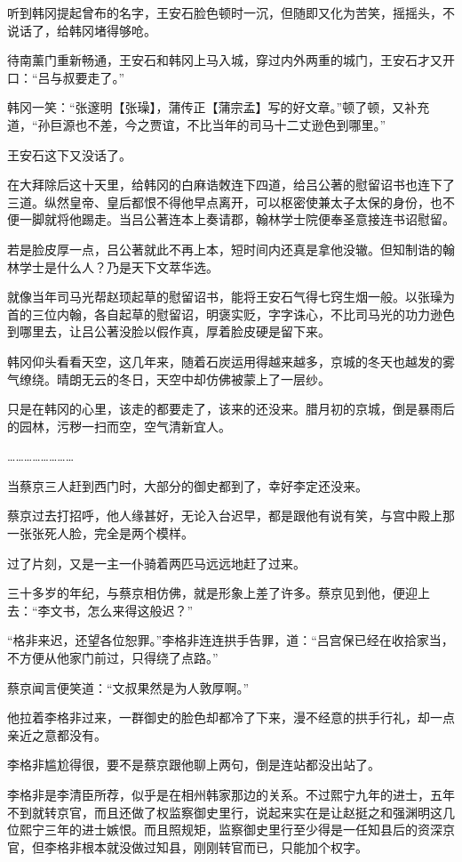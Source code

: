 听到韩冈提起曾布的名字，王安石脸色顿时一沉，但随即又化为苦笑，摇摇头，不说话了，给韩冈堵得够呛。 

待南薰门重新畅通，王安石和韩冈上马入城，穿过内外两重的城门，王安石才又开口：“吕与叔要走了。” 

韩冈一笑：“张邃明【张璪】，蒲传正【蒲宗孟】写的好文章。”顿了顿，又补充道，“孙巨源也不差，今之贾谊，不比当年的司马十二丈逊色到哪里。” 

王安石这下又没话了。 

在大拜除后这十天里，给韩冈的白麻诰敇连下四道，给吕公著的慰留诏书也连下了三道。纵然皇帝、皇后都恨不得他早点离开，可以枢密使兼太子太保的身份，也不便一脚就将他踢走。当吕公著连本上奏请郡，翰林学士院便奉圣意接连书诏慰留。 

若是脸皮厚一点，吕公著就此不再上本，短时间内还真是拿他没辙。但知制诰的翰林学士是什么人？乃是天下文萃华选。 

就像当年司马光帮赵顼起草的慰留诏书，能将王安石气得七窍生烟一般。以张璪为首的三位内翰，各自起草的慰留诏，明褒实贬，字字诛心，不比司马光的功力逊色到哪里去，让吕公著没脸以假作真，厚着脸皮硬是留下来。 

韩冈仰头看看天空，这几年来，随着石炭运用得越来越多，京城的冬天也越发的雾气缭绕。晴朗无云的冬日，天空中却仿佛被蒙上了一层纱。 

只是在韩冈的心里，该走的都要走了，该来的还没来。腊月初的京城，倒是暴雨后的园林，污秽一扫而空，空气清新宜人。 

…………………… 

当蔡京三人赶到西门时，大部分的御史都到了，幸好李定还没来。 

蔡京过去打招呼，他人缘甚好，无论入台迟早，都是跟他有说有笑，与宫中殿上那一张张死人脸，完全是两个模样。 

过了片刻，又是一主一仆骑着两匹马远远地赶了过来。 

三十多岁的年纪，与蔡京相仿佛，就是形象上差了许多。蔡京见到他，便迎上去：“李文书，怎么来得这般迟？” 

“格非来迟，还望各位恕罪。”李格非连连拱手告罪，道：“吕宫保已经在收拾家当，不方便从他家门前过，只得绕了点路。” 

蔡京闻言便笑道：“文叔果然是为人敦厚啊。” 

他拉着李格非过来，一群御史的脸色却都冷了下来，漫不经意的拱手行礼，却一点亲近之意都没有。 

李格非尴尬得很，要不是蔡京跟他聊上两句，倒是连站都没出站了。 

李格非是李清臣所荐，似乎是在相州韩家那边的关系。不过熙宁九年的进士，五年不到就转京官，而且还做了权监察御史里行，说起来实在是让赵挺之和强渊明这几位熙宁三年的进士嫉恨。而且照规矩，监察御史里行至少得是一任知县后的资深京官，但李格非根本就没做过知县，刚刚转官而已，只能加个权字。 

